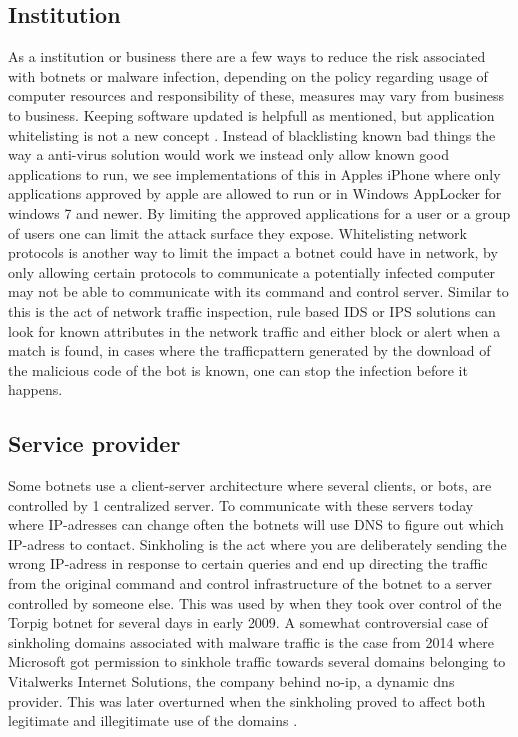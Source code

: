 \subsection{Institution}%
As a institution or business there are a few ways to reduce the risk associated with botnets or malware infection, depending on the policy regarding usage of computer resources and responsibility of these, measures may vary from business to business.
Keeping software updated is helpfull as mentioned, but application whitelisting is not a new concept \cite{jan-mansfield-whitelist}. Instead of blacklisting known bad things the way a anti-virus solution would work we instead only allow known good applications to run, we see implementations of this in Apples iPhone where only applications approved by apple are allowed to run or in Windows AppLocker \cite{jan-windows-applocker} for windows 7 and newer. By limiting the approved applications for a user or a group of users one can limit the attack surface they expose.
Whitelisting network protocols is another way to limit the impact a botnet could have in network, by only allowing certain protocols to communicate a potentially infected computer may not be able to communicate with its command and control server. Similar to this is the act of network traffic inspection, rule based IDS or IPS solutions can look for known attributes in the network traffic and either block or alert when a match is found, in cases where the trafficpattern generated by the download of the malicious code of the bot is known, one can stop the infection before it happens. 




\subsection{Service provider}
Some botnets use a client-server architecture where several clients, or bots, are controlled by 1 centralized server. To communicate with these servers today where IP-adresses can change often the botnets will use DNS to figure out which IP-adress to contact. Sinkholing is the act where you are deliberately sending the wrong IP-adress in response to certain queries and end up directing the traffic from the original command and control infrastructure of the botnet to a server controlled by someone else.
This was used by \cite{jan_stone-gross} when they took over control of the Torpig botnet for several days in early 2009. A somewhat controversial case of sinkholing domains associated with malware traffic is the case from 2014 where Microsoft got permission to sinkhole traffic towards several domains belonging to Vitalwerks Internet Solutions, the company behind no-ip, a dynamic dns provider. This was later overturned when the sinkholing proved to affect both legitimate and illegitimate use of the domains \cite{jan-microsoft-no-ip}.

